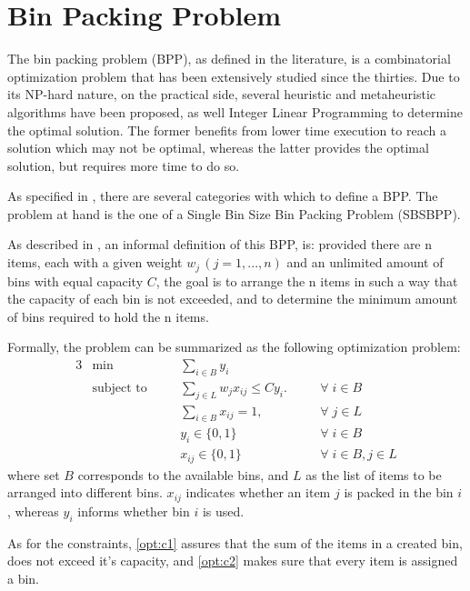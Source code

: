 \chapter{Bin Packing Problem} \label{chap:literature review}

The bin packing problem (BPP), as defined in the literature, is a combinatorial
optimization problem that has been extensively studied since the thirties. Due
to its NP-hard nature, on the practical side, several heuristic and
metaheuristic algorithms have been proposed, as well Integer Linear Programming
to determine the optimal solution. The former benefits from lower time execution
to reach a solution which may not be optimal, whereas the latter provides the
optimal solution, but requires more time to do so.

As specified in \cite{wascher2007improved}, there are several categories with
which to define a BPP. The problem at hand is the one of a Single Bin Size Bin
Packing Problem (SBSBPP).

As described in \cite{delorme2016bin}, an informal definition of this BPP, is:
provided there are n items, each with a given weight \( w_j  \, (j = 1, ..., n)
\) and an unlimited amount of bins with equal capacity \( C \), the goal is to
arrange the n items in such a way that the capacity of each bin is not exceeded,
and to determine the minimum amount of bins required to hold the n items.

Formally, the problem can be summarized as the following optimization problem:
\begin{alignat}{3}
\label{BPP model}
    &\min       &&\sum_{i \in B} y_i && \\
    &\text{subject to} \quad
                && \sum_{j \in L} w_j x_{ij} \leq C y_i. \quad      && \forall \; i \in B \label{opt:c1} \\
    &           && \sum_{i \in B} x_{ij} = 1, \quad                 && \forall \; j \in L \label{opt:c2} \\
    &           && y_i \in \{0, 1\}                                 && \forall \; i \in B \\
    &           && x_{ij} \in \{0,1\}                               && \forall \; i \in B, j \in L
\end{alignat}
where set $B$ corresponds to the available bins, and $L$ as the list of items to
be arranged into different bins. $x_{ij}$ indicates whether an item $j$ is
packed in the bin $i$, whereas $y_i$ informs whether bin $i$ is used. 

As for the constraints, \ref{opt:c1} assures that the sum of the items in a
created bin, does not exceed it's capacity, and \ref{opt:c2} makes sure that every
item is assigned a bin. 

